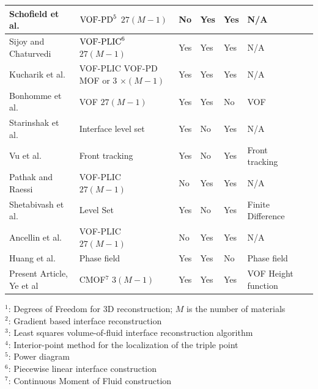 \documentclass[]{article}
\newcommand{\tn}{\textnormal}
\begin{document}
\begin{table}[htbp]
{\begin{tabular}[h]{|C{2cm}|C{2cm}|C{2cm}|C{2cm}|C{2cm}|C{2cm}|C{2cm}|}
    Schofield et al.~\cite{schofield2008material, schofield2009second} & $\tn{VOF-PD}^5$ \newline $27(M-1)$ 
	                                         & No & Yes & Yes & N/A \\ \hline
    Sijoy and Chaturvedi\cite{sijoy2010volume} & $\tn{VOF-PLIC}^6$ \newline $27(M-1)$& 
	                                      Yes & Yes & Yes & N/A \\ \hline
    Kucharik et al.~\cite{kucharik2010comparative} & VOF-PLIC \newline VOF-PD \newline MOF  or 3 $\times(M-1)$ &
	                                         Yes & Yes & Yes & N/A \\ \hline
    Bonhomme et al.~\cite{bonhomme2012inertial} & VOF \newline $27(M-1)$ & Yes & Yes & No & VOF \\ \hline
    Starinshak et al.~\cite{starinshak2014new} & Interface level set & Yes & No & Yes & N/A \\ \hline
    Vu et al.~\cite{vu2015numerical} & Front tracking & Yes & No & Yes & Front tracking \\ \hline
    Pathak and Raessi\cite{pathak2016three} & VOF-PLIC \newline $27(M-1)$ & No & Yes & Yes & N/A \\ \hline
    Shetabivash et al.~\cite{shetabivash2020multiple} & Level Set & Yes & No & Yes & Finite Difference \\ \hline
    Ancellin et al.~\cite{ancellin2022extension} & VOF-PLIC \newline $27(M-1)$ & No & Yes & Yes & N/A \\ \hline
    Huang et al.~\cite{HUANG2022110795} & Phase field & Yes & Yes & No & Phase field \\ \hline
    Present Article, Ye et al & CMOF$^7$ \newline $3(M-1)$ & Yes & Yes & Yes & VOF Height function \\ \hline
  \end{tabular}
  }
 \scalebox{0.7}
 {
 \begin{minipage}{\textwidth}
   $^1$: Degrees of Freedom for 3D reconstruction; $M$ is the number of materials \\
   $^2$: Gradient based interface reconstruction\\
   $^3$: Least squares volume-of-fluid interface reconstruction algorithm\\
   $^4$: Interior-point method for the localization of the triple point\\
   $^5$: Power diagram\\
   $^6$: Piecewise linear interface construction\\
   $^7$: Continuous Moment of Fluid construction\\
   \end{minipage}
 }


\end{table}
\end{document}

